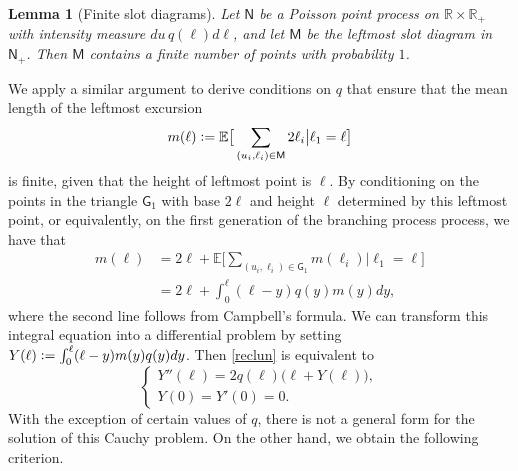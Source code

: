 \documentclass[12pt]{article}
\numberwithin{equation}{section}
\newtheorem{lemma}[theorem]{Lemma}
\newcommand{\EE}{\mathbb E}
\newcommand{\RR}{\mathbb R}
\newcommand{\sG}{\mathsf{G}}
\newcommand{\sM}{\mathsf{M}}
\newcommand{\sN}{\mathsf{N}}
\begin{document}
\begin{lemma}[Finite slot diagrams]\label{Tpos}
Let $\sN$ be a Poisson point process on $\RR\times \RR_+$ with intensity measure $du\,q(\ell) d\ell$, and let $\sM$ be the leftmost slot diagram in $\sN_+$. Then $\sM$ contains a finite number of points with probability $1$.
\end{lemma}

We apply a similar argument to derive conditions on $q$ that ensure that the mean length of the leftmost excursion
\begin{equation}\label{3131}
m(\ell)\vcentcolon=\EE\big[\sum_{(u_i, \ell_i)\in \sM}2\ell_i\big| \ell_1=\ell\big]
\end{equation}
is finite, given that the height of leftmost point is $\ell$. By conditioning on the points in the triangle $\sG_1$ with base $2\ell$ and height $\ell$ determined by this leftmost point, or equivalently, on the first generation of the branching process process, we have that
\begin{equation}\label{reclun}
\begin{aligned}
m(\ell)&=2\ell + \EE\big[\sum_{(u_i, \ell_i)\in \sG_1} m(\ell_i)\big| \ell_1=\ell\big]\\
	  &=2\ell+ \int_0^\ell (\ell-y)q(y)m(y)dy,
\end{aligned}
\end{equation}
where the second line follows from Campbell's formula. We can transform this integral equation into a differential problem by setting $Y(\ell)\vcentcolon =\int_0^\ell(\ell-y)m(y)q(y)dy$.  Then \eqref{reclun} is equivalent to
\begin{equation}\label{Ydiff}
	\left\{
	\begin{array}{l}
		Y''(\ell)=2q(\ell)\big(\ell +Y(\ell)\big), \\
		Y(0)=Y'(0)=0.
	\end{array}
	\right.
\end{equation}
With the exception of certain values of $q$, there is not a general form for the solution of this Cauchy problem. On the other hand, we obtain the following criterion.
\end{document}
